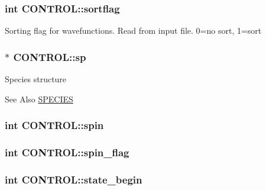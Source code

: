 \hypertarget{struct_c_o_n_t_r_o_l_ae0f5f57f1562c67d0f349bcbc2248de8}{
\subsubsection[{sortflag}]{\setlength{\rightskip}{0pt plus 5cm}int C\-O\-N\-T\-R\-O\-L\-::sortflag}}\label{struct_c_o_n_t_r_o_l_ae0f5f57f1562c67d0f349bcbc2248de8}
Sorting flag for wavefunctions. Read from input file. 0=no sort, 1=sort \hypertarget{struct_c_o_n_t_r_o_l_adc51da670b085b44e45b30153309c631}{
\subsubsection[{sp}]{ $\ast$ C\-O\-N\-T\-R\-O\-L\-::sp}}\label{struct_c_o_n_t_r_o_l_adc51da670b085b44e45b30153309c631}
Species structure \begin{DoxySeeAlso}{See Also}
\hyperlink{struct_s_p_e_c_i_e_s}{S\-P\-E\-C\-I\-E\-S} 
\end{DoxySeeAlso}
\hypertarget{struct_c_o_n_t_r_o_l_a6f3eab1adde3e0854758cc3ef75c7b5a}{
\subsubsection[{spin}]{\setlength{\rightskip}{0pt plus 5cm}int C\-O\-N\-T\-R\-O\-L\-::spin}}\label{struct_c_o_n_t_r_o_l_a6f3eab1adde3e0854758cc3ef75c7b5a}
\hypertarget{struct_c_o_n_t_r_o_l_a3e808787eb0000d896043edffcea3e60}{
\subsubsection[{spin\-\_\-flag}]{\setlength{\rightskip}{0pt plus 5cm}int C\-O\-N\-T\-R\-O\-L\-::spin\-\_\-flag}}\label{struct_c_o_n_t_r_o_l_a3e808787eb0000d896043edffcea3e60}
\hypertarget{struct_c_o_n_t_r_o_l_aadaaeb1f5694dabddd9413fba092c782}{
\subsubsection[{state\-\_\-begin}]{\setlength{\rightskip}{0pt plus 5cm}int C\-O\-N\-T\-R\-O\-L\-::state\-\_\-begin}}\label{struct_c_o_n_t_r_o_l_aadaaeb1f5694dabddd9413fba092c782}
